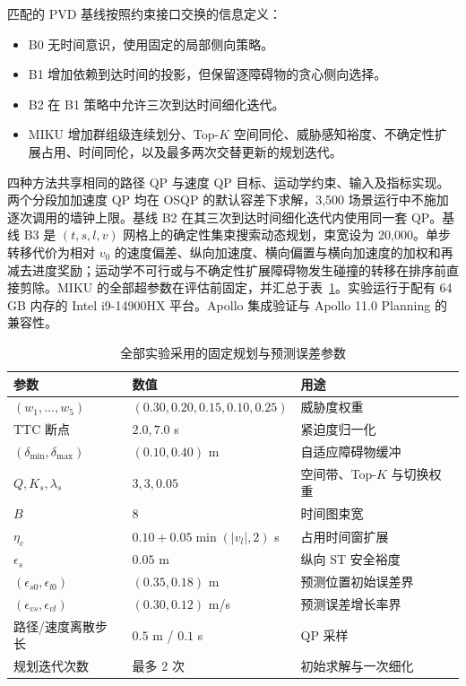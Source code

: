 匹配的 PVD 基线按照约束接口交换的信息定义：
\begin{itemize}
  \item B0 无时间意识，使用固定的局部侧向策略。
  \item B1 增加依赖到达时间的投影，但保留逐障碍物的贪心侧向选择。
  \item B2 在 B1 策略中允许三次到达时间细化迭代。
  \item MIKU 增加群组级连续划分、Top-$K$ 空间同伦、威胁感知裕度、不确定性扩展占用、时间同伦，以及最多两次交替更新的规划迭代。
\end{itemize}
四种方法共享相同的路径 QP 与速度 QP 目标、运动学约束、输入及指标实现。两个分段加加速度 QP 均在 OSQP 的默认容差下求解，3{,}500 场景运行中不施加逐次调用的墙钟上限。基线 B2 在其三次到达时间细化迭代内使用同一套 QP。基线 B3 是 $(t,s,l,v)$ 网格上的确定性集束搜索动态规划，束宽设为 20{,}000。单步转移代价为相对 $v_0$ 的速度偏差、纵向加速度、横向偏置与横向加速度的加权和再减去进度奖励；运动学不可行或与不确定性扩展障碍物发生碰撞的转移在排序前直接剪除。MIKU 的全部超参数在评估前固定，并汇总于表~\ref{zh:tab:fixed_parameters}。实验运行于配有 64 GB 内存的 Intel i9-14900HX 平台。Apollo 集成验证与 Apollo 11.0 Planning 的兼容性。

\begin{table}[t]
\centering
\caption{全部实验采用的固定规划与预测误差参数}
\label{zh:tab:fixed_parameters}
\small
\begin{tabular}{lll}
\toprule
参数 & 数值 & 用途\\
\midrule
$(w_1,\ldots,w_5)$ & $(0.30,0.20,0.15,0.10,0.25)$ & 威胁度权重\\
TTC 断点 & $2.0,7.0$ s & 紧迫度归一化\\
$(\delta_{\min},\delta_{\max})$ & $(0.10,0.40)$ m & 自适应障碍物缓冲\\
$Q,K_s,\lambda_s$ & $3,3,0.05$ & 空间带、Top-$K$ 与切换权重\\
$B$ & $8$ & 时间图束宽\\
$\eta_c$ & $0.10+0.05\min(|v_l|,2)$ s & 占用时间窗扩展\\
$\epsilon_s$ & $0.05$ m & 纵向 ST 安全裕度\\
$(\epsilon_{s0},\epsilon_{l0})$ & $(0.35,0.18)$ m & 预测位置初始误差界\\
$(\epsilon_{vs},\epsilon_{vl})$ & $(0.30,0.12)$ m/s & 预测误差增长率界\\
路径/速度离散步长 & $0.5$ m / $0.1$ s & QP 采样\\
规划迭代次数 & 最多 $2$ 次 & 初始求解与一次细化\\
\bottomrule
\end{tabular}
\end{table}

